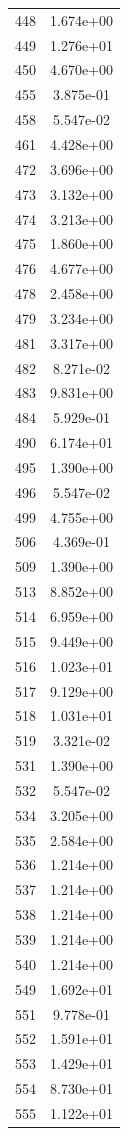 \documentclass[12pt]{article}
\begin{document}
\begin{longtable}{@{}cc@{}}
448 & 1.674e+00 \\
449 & 1.276e+01 \\
450 & 4.670e+00 \\
455 & 3.875e-01 \\
458 & 5.547e-02 \\
461 & 4.428e+00 \\
472 & 3.696e+00 \\
473 & 3.132e+00 \\
474 & 3.213e+00 \\
475 & 1.860e+00 \\
476 & 4.677e+00 \\
478 & 2.458e+00 \\
479 & 3.234e+00 \\
481 & 3.317e+00 \\
482 & 8.271e-02 \\
483 & 9.831e+00 \\
484 & 5.929e-01 \\
490 & 6.174e+01 \\
495 & 1.390e+00 \\
496 & 5.547e-02 \\
499 & 4.755e+00 \\
506 & 4.369e-01 \\
509 & 1.390e+00 \\
513 & 8.852e+00 \\
514 & 6.959e+00 \\
515 & 9.449e+00 \\
516 & 1.023e+01 \\
517 & 9.129e+00 \\
518 & 1.031e+01 \\
519 & 3.321e-02 \\
531 & 1.390e+00 \\
532 & 5.547e-02 \\
534 & 3.205e+00 \\
535 & 2.584e+00 \\
536 & 1.214e+00 \\
537 & 1.214e+00 \\
538 & 1.214e+00 \\
539 & 1.214e+00 \\
540 & 1.214e+00 \\
549 & 1.692e+01 \\
551 & 9.778e-01 \\
552 & 1.591e+01 \\
553 & 1.429e+01 \\
554 & 8.730e+01 \\
555 & 1.122e+01 \\

\end{longtable}
\end{document}
